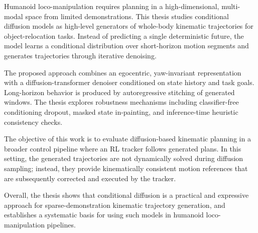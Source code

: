 Humanoid loco-manipulation requires planning in a high-dimensional, multi-modal space from limited demonstrations. This thesis studies conditional diffusion models as high-level generators of whole-body kinematic trajectories for object-relocation tasks. Instead of predicting a single deterministic future, the model learns a conditional distribution over short-horizon motion segments and generates trajectories through iterative denoising.

The proposed approach combines an egocentric, yaw-invariant representation with a diffusion-transformer denoiser conditioned on state history and task goals. Long-horizon behavior is produced by autoregressive stitching of generated windows. The thesis explores robustness mechanisms including classifier-free conditioning dropout, masked state in-painting, and inference-time heuristic consistency checks.

The objective of this work is to evaluate diffusion-based kinematic planning in a broader control pipeline where an RL tracker follows generated plans. In this setting, the generated trajectories are not dynamically solved during diffusion sampling; instead, they provide kinematically consistent motion references that are subsequently corrected and executed by the tracker.

Overall, the thesis shows that conditional diffusion is a practical and expressive approach for sparse-demonstration kinematic trajectory generation, and establishes a systematic basis for using such models in humanoid loco-manipulation pipelines.
